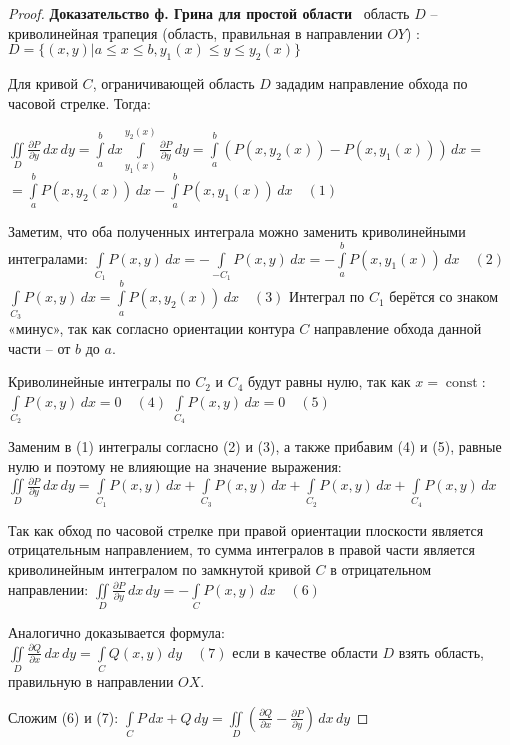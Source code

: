 \begin{proof}
\textbf{Доказательство ф. Грина для простой области}
\mathLet \ область $D$ -- криволинейная трапеция (область, правильная в направлении $OY$)
: $D = \{ (x,y)|a \le x \le b, y_1(x) \le y \le y_2(x) \}$

Для кривой $C$, ограничивающей область $D$ зададим направление обхода по часовой стрелке. Тогда:

$\iint\limits_{D} \frac{\partial P}{\partial y} \,dx\,dy = \int\limits_{a}^{b}dx \int\limits_{y_1(x)}^{y_2(x)} \frac{\partial P}{\partial y} \,dy = \int\limits_{a}^{b} (P(x,y_2(x)) - P(x,y_1(x))) \,dx =$
$= \int\limits_{a}^{b} P(x,y_2(x)) \,dx - \int\limits_{a}^{b} P(x,y_1(x)) \,dx \quad (1)$

Заметим, что оба полученных интеграла можно заменить криволинейными интегралами:
$\int\limits_{C_1} P(x,y) \,dx = -\int\limits_{-C_1} P(x,y) \,dx = -\int\limits_{a}^{b} P(x,y_1(x)) \,dx \quad (2)$
$\int\limits_{C_3} P(x,y) \,dx = \int\limits_{a}^{b} P(x,y_2(x)) \,dx \quad (3)$
Интеграл по $C_1$ берётся со знаком «минус», так как согласно ориентации контура $C$ направление обхода данной части -- от $b$ до $a$.

Криволинейные интегралы по $C_2$ и $C_4$ будут равны нулю, так как $x = \operatorname{const}$:
$\int\limits_{C_2} P(x,y) \,dx = 0 \quad (4)$
$\int\limits_{C_4} P(x,y) \,dx = 0 \quad (5)$

Заменим в (1) интегралы согласно (2) и (3), а также прибавим (4) и (5), равные нулю и поэтому не влияющие на значение выражения:\\
$\iint\limits_{D} \frac{\partial P}{\partial y} \,dx\,dy = \int\limits_{C_1} P(x,y) \,dx + \int\limits_{C_3} P(x,y) \,dx + \int\limits_{C_2} P(x,y) \,dx + \int\limits_{C_4} P(x,y) \,dx$

Так как обход по часовой стрелке при правой ориентации плоскости является отрицательным направлением, то сумма интегралов в правой части является криволинейным интегралом по замкнутой кривой $C$ в отрицательном направлении:
$\iint\limits_{D} \frac{\partial P}{\partial y} \,dx\,dy = -\int\limits_{C} P(x,y) \,dx \quad (6)$

Аналогично доказывается формула:\\
$\iint\limits_{D} \frac{\partial Q}{\partial x} \,dx\,dy = \int\limits_{C} Q(x,y) \,dy \quad (7)$
если в качестве области $D$ взять область, правильную в направлении $OX$.

Сложим (6) и (7):
$\int\limits_{C} P \,dx + Q \,dy = \iint\limits_{D} \left( \frac{\partial Q}{\partial x} - \frac{\partial P}{\partial y} \right) \,dx\,dy$
\end{proof}

